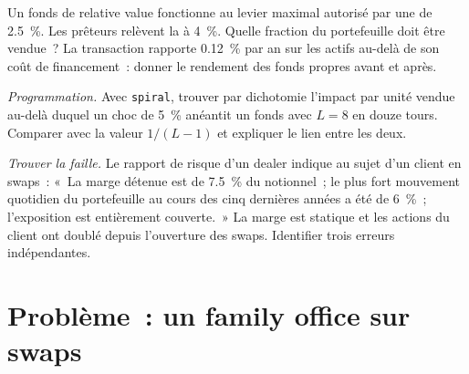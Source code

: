 \begin{exercise}[$\star\star$]\label{exo:m1:financing:6}
Un fonds de relative value fonctionne au levier maximal autorisé par une 
de 2.5~\%. Les prêteurs relèvent la  à 4~\%. Quelle fraction du portefeuille doit être
vendue~? La transaction rapporte 0.12~\% par an sur les actifs au-delà de son coût de financement~:
donner le rendement des fonds propres avant et après.
\end{exercise}

\begin{exercise}[$\star\star\star$]\label{exo:m1:financing:7}
\emph{Programmation.} Avec \texttt{spiral}, trouver par dichotomie l'impact par unité
vendue au-delà duquel un choc de 5~\% anéantit un fonds avec $L = 8$ en douze
tours. Comparer avec la valeur $1/(L-1)$ et expliquer le lien entre les deux.
\end{exercise}

\begin{exercise}[$\star\star\star$]\label{exo:m1:financing:8}
\emph{Trouver la faille.} Le rapport de risque d'un dealer indique au sujet d'un client en swaps~: «~La marge
détenue est de 7.5~\% du notionnel~; le plus fort mouvement quotidien du portefeuille au cours des
cinq dernières années a été de 6~\%~; l'exposition est entièrement couverte.~» La marge est
statique et les actions du client ont doublé depuis l'ouverture des swaps.
Identifier trois erreurs indépendantes.
\end{exercise}

\section{Problème~: un family office sur swaps}

